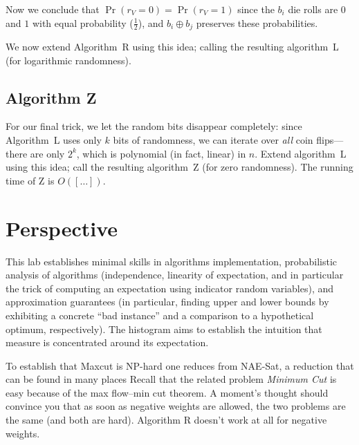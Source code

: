 \documentclass{tufte-handout}
\begin{document}
Now we conclude that $\Pr(r_V=0) = \Pr(r_V=1)$ since the $b_i$ die rolls are $0$ and $1$ with equal probability ($\frac{1}{2}$), and $b_i \oplus b_j$ preserves these probabilities.

We now extend Algorithm~R using this idea; calling the resulting
algorithm~L (for logarithmic randomness).

\subsection{Algorithm Z}

For our final trick, we let the random bits disappear completely:
since Algorithm~L uses only $k$ bits of randomness, we can iterate
over \emph{all} coin flips---there are only $2^k$, which is polynomial
(in fact, linear) in $n$.
Extend algorithm~L using this idea; call the resulting algorithm~Z
(for zero randomness).
The running time of Z is $O([\ldots])$.

\newpage
\section{Perspective}

This lab establishes minimal skills in algorithms implementation,
probabilistic analysis of algorithms (independence, linearity of
expectation, and in particular the trick of computing an expectation
using indicator random variables), and approximation guarantees (in
particular, finding upper and lower bounds by exhibiting a concrete
``bad instance'' and a comparison to a hypothetical optimum,
respectively).
The histogram aims to establish the intuition that measure is
concentrated around its expectation.

\bigskip

To establish that Maxcut is NP-hard one reduces from NAE-Sat, a
reduction that can be found in many places
Recall that the related problem \emph{Minimum Cut} is easy because of
the max flow--min cut theorem.
A moment's thought should convince you that as soon as negative
weights are allowed, the two problems are the same (and both are
hard).
Algorithm R doesn't work at all for negative weights.
\end{document}
